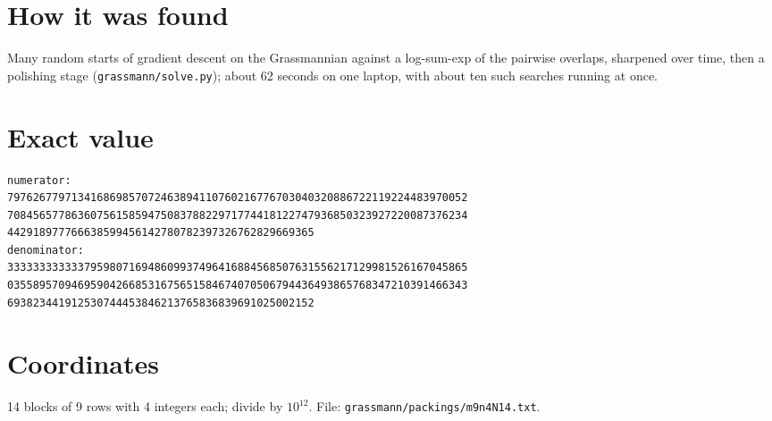 \documentclass[11pt,a4paper]{article}
\begin{document}
\section{How it was found}
Many random starts of gradient descent on the Grassmannian against a log-sum-exp of the pairwise overlaps, sharpened over time, then a polishing stage (\texttt{grassmann/solve.py}); about 62 seconds on one laptop, with about ten such searches running at once.


\appendix
\section{Exact value}
{\small
\begin{verbatim}
numerator:
797626779713416869857072463894110760216776703040320886722119224483970052
708456577863607561585947508378822971774418122747936850323927220087376234
442918977766638599456142780782397326762829669365
denominator:
333333333333795980716948609937496416884568507631556217129981526167045865
035589570946959042668531675651584674070506794436493865768347210391466343
693823441912530744453846213765836839691025002152
\end{verbatim}}

\section{Coordinates}
14 blocks of 9 rows with 4 integers each; divide by $10^{12}$. File: \texttt{grassmann/packings/m9n4N14.txt}.
{\tiny
\begin{multicols}{3}
\end{multicols}}
\end{document}
